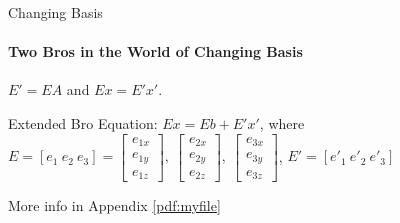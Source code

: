 \documentclass[aspectratio=169]{beamer}
\newcommand{\fbckg}[1]{\usebackgroundtemplate{\texttt{[image: \#1]}}}%
\begin{document}
\begin{frame}[t]{Changing Basis}
    \framesubtitle{Two Bros in the World of Changing Basis}
    \LARGE \centering$E' = EA$ and $Ex=E'x'$.

    Extended Bro Equation: $Ex = Eb + E'x'$, where $E = [e_1\ e_2\ e_3] = \begin{bmatrix}e_{1x}\\e_{1y} \\ e_{1z}\end{bmatrix},\ \begin{bmatrix}e_{2x}\\e_{2y} \\ e_{2z}\end{bmatrix},\ \begin{bmatrix}e_{3x}\\e_{3y} \\ e_{3z}\end{bmatrix}$, $E' = [e'_1\ e'_2\ e'_3]$ \smallskip

    More info in Appendix \ref{pdf:myfile}
\end{frame}

\usebackgroundtemplate{}

\fbckg{fibeamer/figs/common.png}
\end{document}
